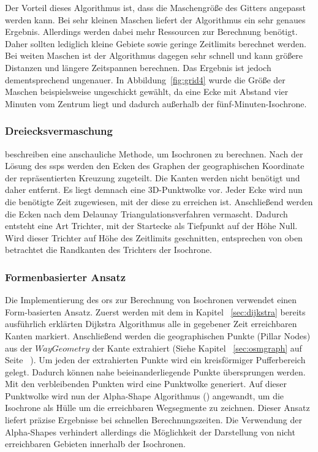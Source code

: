 Der Vorteil dieses Algorithmus ist, dass die Maschengröße des Gitters angepasst werden kann.
Bei sehr kleinen Maschen liefert der Algorithmus ein sehr genaues Ergebnis.
Allerdings werden dabei mehr Ressourcen zur Berechnung benötigt.
Daher sollten lediglich kleine Gebiete sowie geringe Zeitlimits berechnet werden.
Bei weiten Maschen ist der Algorithmus dagegen sehr schnell und kann größere Distanzen und längere Zeitspannen berechnen.
Das Ergebnis ist jedoch dementsprechend ungenauer.
In Abbildung~\ref{fig:grid4} wurde die Größe der Maschen beispielsweise ungeschickt gewählt, da eine Ecke mit Abstand vier Minuten vom Zentrum liegt und dadurch außerhalb der fünf-Minuten-Isochrone.

\subsubsection{Dreiecksvermaschung}
\cite{isochrones} beschreiben eine anschauliche Methode, um Isochronen zu berechnen.
Nach der Lösung des \gls{ssp}s werden den Ecken des Graphen der geographischen Koordinate der repräsentierten Kreuzung zugeteilt.
Die Kanten werden nicht benötigt und daher entfernt.
Es liegt demnach eine 3D-Punktwolke vor.
Jeder Ecke wird nun die benötigte Zeit zugewiesen, mit der diese zu erreichen ist.
Anschließend werden die Ecken nach dem Delaunay Triangulationsverfahren vermascht.
Dadurch entsteht eine Art Trichter, mit der Startecke als Tiefpunkt auf der Höhe Null.
Wird dieser Trichter auf Höhe des Zeitlimits geschnitten, entsprechen von oben betrachtet die Randkanten des Trichters der Isochrone.


\subsubsection{Formenbasierter Ansatz}
\label{sec:form}
Die Implementierung des \gls{ors} zur Berechnung von Isochronen verwendet einen Form-basierten Ansatz.
Zuerst werden mit dem in Kapitel ~\ref{sec:dijkstra} bereits ausführlich erklärten Dijkstra Algorithmus alle in gegebener Zeit erreichbaren Kanten markiert.
Anschließend werden die geographischen Punkte (Pillar Nodes) aus der $WayGeometry$ der Kante extrahiert (Siehe Kapitel ~\ref{sec:osmgraph} auf Seite ~\pageref{sec:osmgraph}).
Um jeden der extrahierten Punkte wird ein kreisförmiger Pufferbereich gelegt.
Dadurch können nahe beieinanderliegende Punkte übersprungen werden.
Mit den verbleibenden Punkten wird eine Punktwolke generiert.
Auf dieser Punktwolke wird nun der Alpha-Shape Algorithmus (\cite{akkiraju1995alpha}) angewandt, um die Isochrone als Hülle um die erreichbaren Wegsegmente zu zeichnen.
Dieser Ansatz liefert präzise Ergebnisse bei schnellen Berechnungszeiten.
Die Verwendung der Alpha-Shapes verhindert allerdings die Möglichkeit der Darstellung von nicht erreichbaren Gebieten innerhalb der Isochronen.
